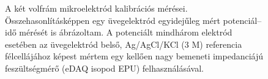 \documentclass[manuscript=article, journal=jceda8]{achemso}
\begin{document}
\begin{figure}
\centering
{}
\caption{A két volfrám mikroelektród kalibrációs mérései. Összehasonlításképpen egy üvegelektród egyidejűleg mért potenciál--idő mérését is ábrázoltam. A potenciált mindhárom elektród esetében az üvegelektród belső, Ag/AgCl/KCl (3 M) referencia félcellájához képest mértem egy kellően nagy bemeneti impedanciájú feszültségmérő (eDAQ isopod EPU) felhasználásával.}
\label{fig:kalibracios_meres}
\end{figure}
\end{document}
